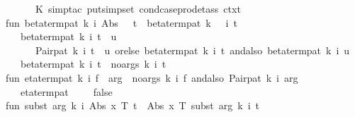 \begin{isabellebody}
\ \ \ \ \ \ \ \ {\isacharparenleft}{\kern0pt}K\ {\isacharparenleft}{\kern0pt}simp{\isacharunderscore}{\kern0pt}tac\ {\isacharparenleft}{\kern0pt}put{\isacharunderscore}{\kern0pt}simpset\ cond{\isacharunderscore}{\kern0pt}case{\isacharunderscore}{\kern0pt}prod{\isacharunderscore}{\kern0pt}eta{\isacharunderscore}{\kern0pt}ss\ ctxt{\isacharparenright}{\kern0pt}\ {}{\isacharparenright}{\kern0pt}{\isacharparenright}{\kern0pt}{\isacharparenright}{\kern0pt}{\isacharsemicolon}{\kern0pt}\isanewline
\isanewline
\ \ fun\ beta{\isacharunderscore}{\kern0pt}term{\isacharunderscore}{\kern0pt}pat\ k\ i\ {\isacharparenleft}{\kern0pt}Abs\ {\isacharparenleft}{\kern0pt}{\isacharunderscore}{\kern0pt}{\isacharcomma}{\kern0pt}\ {\isacharunderscore}{\kern0pt}{\isacharcomma}{\kern0pt}\ t{\isacharparenright}{\kern0pt}{\isacharparenright}{\kern0pt}\ {\isacharequal}{\kern0pt}\ beta{\isacharunderscore}{\kern0pt}term{\isacharunderscore}{\kern0pt}pat\ {\isacharparenleft}{\kern0pt}k\ {\isacharplus}{\kern0pt}\ {}{\isacharparenright}{\kern0pt}\ i\ t\isanewline
\ \ \ \ {\isacharbar}{\kern0pt}\ beta{\isacharunderscore}{\kern0pt}term{\isacharunderscore}{\kern0pt}pat\ k\ i\ {\isacharparenleft}{\kern0pt}t\ {\isachardollar}{\kern0pt}\ u{\isacharparenright}{\kern0pt}\ {\isacharequal}{\kern0pt}\isanewline
\ \ \ \ \ \ \ \ Pair{\isacharunderscore}{\kern0pt}pat\ k\ i\ {\isacharparenleft}{\kern0pt}t\ {\isachardollar}{\kern0pt}\ u{\isacharparenright}{\kern0pt}\ orelse\ {\isacharparenleft}{\kern0pt}beta{\isacharunderscore}{\kern0pt}term{\isacharunderscore}{\kern0pt}pat\ k\ i\ t\ andalso\ beta{\isacharunderscore}{\kern0pt}term{\isacharunderscore}{\kern0pt}pat\ k\ i\ u{\isacharparenright}{\kern0pt}\isanewline
\ \ \ \ {\isacharbar}{\kern0pt}\ beta{\isacharunderscore}{\kern0pt}term{\isacharunderscore}{\kern0pt}pat\ k\ i\ t\ {\isacharequal}{\kern0pt}\ no{\isacharunderscore}{\kern0pt}args\ k\ i\ t{\isacharsemicolon}{\kern0pt}\isanewline
\ \ fun\ eta{\isacharunderscore}{\kern0pt}term{\isacharunderscore}{\kern0pt}pat\ k\ i\ {\isacharparenleft}{\kern0pt}f\ {\isachardollar}{\kern0pt}\ arg{\isacharparenright}{\kern0pt}\ {\isacharequal}{\kern0pt}\ no{\isacharunderscore}{\kern0pt}args\ k\ i\ f\ andalso\ Pair{\isacharunderscore}{\kern0pt}pat\ k\ i\ arg\isanewline
\ \ \ \ {\isacharbar}{\kern0pt}\ eta{\isacharunderscore}{\kern0pt}term{\isacharunderscore}{\kern0pt}pat\ {\isacharunderscore}{\kern0pt}\ {\isacharunderscore}{\kern0pt}\ {\isacharunderscore}{\kern0pt}\ {\isacharequal}{\kern0pt}\ false{\isacharsemicolon}{\kern0pt}\isanewline
\ \ fun\ subst\ arg\ k\ i\ {\isacharparenleft}{\kern0pt}Abs\ {\isacharparenleft}{\kern0pt}x{\isacharcomma}{\kern0pt}\ T{\isacharcomma}{\kern0pt}\ t{\isacharparenright}{\kern0pt}{\isacharparenright}{\kern0pt}\ {\isacharequal}{\kern0pt}\ Abs\ {\isacharparenleft}{\kern0pt}x{\isacharcomma}{\kern0pt}\ T{\isacharcomma}{\kern0pt}\ subst\ arg\ {\isacharparenleft}{\kern0pt}k{\isacharplus}{\kern0pt}{}{\isacharparenright}{\kern0pt}\ i\ t{\isacharparenright}{\kern0pt}\isanewline

\end{isabellebody}
